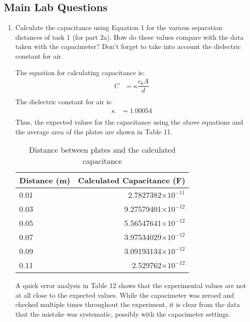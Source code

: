 \documentclass [12pt, letterpaper, twoside] {article}
\begin{document}
\subsection* {Main Lab Questions}
\begin{enumerate}
  \item Calculate the capacitance using Equation 1 for the various separation distances of task 1 (for part 2a). How do these values compare with the data taken with the capacimeter?  Don’t forget to take into account the dielectric constant for air.

  The equation for calculating capacitance is:
  \begin{equation}
    \begin{split}
      C &= \kappa\dfrac{\epsilon_{0}A}{d} \\
    \end{split}
  \end{equation}
  The dielectric constant for air is:
  \begin{equation*}
    \begin{split}
      \kappa &= 1.00054 \\
    \end{split} 
  \end{equation*}
  Thus, the expected values for the capacitance using the above equations  and the average area of the plates are shown in Table 11.
  \begin{table}
    \centering
    \begin{tabular}{| l | r |}
      \hline\hline
      Distance (m) & Calculated Capacitance (F) \\
      \hline
      0.01 & 2.7827382\(\times10^{-11}\) \\
      \hline
      0.03 & 9.27579401\(\times10^{-12}\) \\
      \hline
      0.05 & 5.56547641\(\times10^{-12}\) \\
      \hline
      0.07 & 3.97534029\(\times10^{-12}\) \\
      \hline
      0.09 & 3.09193134\(\times10^{-12}\) \\
      \hline
      0.11 & 2.529762\(\times10^{-12}\) \\
      \hline\hline
    \end{tabular}
    \caption{Distance between plates and the calculated capacitance}
  \end{table}
  A quick error analysis in Table 12 shows that the experimental values are not at all close to the expected values. While the capacimeter was zeroed and checked multiple times throughout the experiment, it is clear from the data that the mistake was systematic, possibly with the capacimeter settings.

\end{enumerate}
\end{document}
